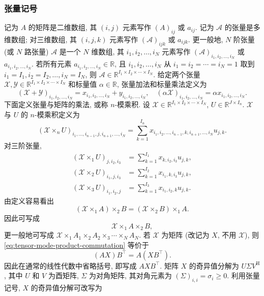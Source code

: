 \subsubsection{{张量记号}}\label{subsec:tensor-notations}
{记为 $A$ 的矩阵是二维数组, 其 $(i,j)$ 元素写作 $(A)_{ij}$ 或 $a_{ij}$. 记为 $\mathcal{A}$ 的张量是多维数组; 对三维数组, 其 $(i,j,k)$ 元素写作 $(\mathcal{A})_{ijk}$ 或 $a_{ijk}$. 更一般地, $N$ 阶张量 (或 $N$ 路张量) $\mathcal{A}$ 是一个 $N$ 维数组, 其 $i_1,i_2,\ldots,i_N$ 元素写作 $(\mathcal{A})_{i_1,i_2,\ldots,i_N}$ 或 $a_{i_1,i_2,\ldots,i_N}$. 若所有元素 $a_{i_1,i_2,\ldots,i_N}\in\mathbb{R}$, 且 $i_1,i_2,\ldots,i_N$ 从 $i_1=i_2=\cdots=i_N=1$ 取到 $i_1=I_1,i_2=I_2,\ldots,i_N=I_N$, 则 $\mathcal{A}\in\mathbb{R}^{I_1\times I_2\times\cdots\times I_N}$.}
{给定两个张量 $\mathcal{X},\mathcal{Y}\in\mathbb{R}^{I_1\times I_2\times\cdots\times I_N}$ 和标量值 $\alpha\in\mathbb{R}$, 张量加法和标量乘法定义为}
\[(\mathcal{X}+\mathcal{Y})_{i_1,i_2,\ldots,i_N}=x_{i_1,i_2,\ldots,i_N}+y_{i_1,i_2,\ldots,i_N},\quad
(\alpha\mathcal{X})_{i_1,i_2,\ldots,i_N}=\alpha x_{i_1,i_2,\ldots,i_N}.\]
{下面定义张量与矩阵的乘法, 或称 $n$-模乘积. 设 $\mathcal{X}\in\mathbb{R}^{I_1\times I_2\times\cdots\times I_N}$, $U\in\mathbb{R}^{J\times I_n}$. $\mathcal{X}$ 与 $U$ 的 $n$-模乘积定义为}
\[(\mathcal{X}\times_nU)_{i_1,\ldots,i_{n-1},j,i_{n+1},\ldots,i_N}
=\sum_{k=1}^{I_n}x_{i_1,i_2,\ldots,i_{n-1},k,i_{n+1},\ldots,i_N}u_{j,k}.\]
{对三阶张量,}
\[\begin{aligned}
(\mathcal{X}\times_1U)_{j,i_2,i_3}&=\sum_{k=1}^{I_1}x_{k,i_2,i_3}u_{j,k},\\
(\mathcal{X}\times_2U)_{i_1,j,i_3}&=\sum_{k=1}^{I_2}x_{i_1,k,i_3}u_{j,k},\\
(\mathcal{X}\times_3U)_{i_1,i_2,j}&=\sum_{k=1}^{I_3}x_{i_1,i_2,k}u_{j,k}.
\end{aligned}\]
{由定义容易看出}
\begin{equation}\label{eq:tensor-mode-product-commutation}
(\mathcal{X}\times_1A)\times_2B=(\mathcal{X}\times_2B)\times_1A.
\end{equation}
{因此可写成}
\[\mathcal{X}\times_1A\times_2B,\]
{更一般地可写成 $\mathcal{X}\times_1A_1\times_2A_2\times_3\cdots\times_NA_N$. 若 $\mathcal{X}$ 为矩阵 (改记为 $X$, 不用 $\mathcal{X}$), 则 \eqref{eq:tensor-mode-product-commutation} 等价于}
\[(AX)B^{\top}=A(XB^{\top}).\]
{因此在通常的线性代数中省略括号, 即写成 $AXB^{\top}$. 矩阵 $X$ 的奇异值分解为 $U\Sigma V^{\mathrm H}$, 其中 $U$ 和 $V$ 为酉矩阵, $\Sigma$ 为对角矩阵, 其对角元素为 $(\Sigma)_{i,i}=\sigma_i\ge0$. 利用张量记号, $X$ 的奇异值分解可改写为}
